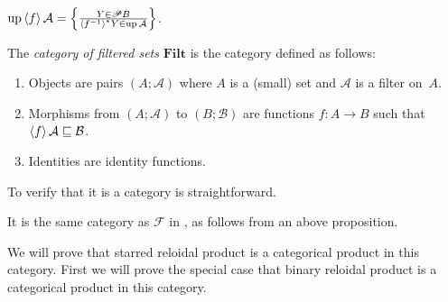 \begin{cor}
$\operatorname{up}\left\langle f\right\rangle\mathcal{A} = \left\{ \frac{Y\in\mathscr{P} B}{\left\langle f^{-1}\right\rangle ^{\ast}Y\in\operatorname{up}\mathcal{A}}\right\}$.
\end{cor}

\begin{defn}
The \emph{category of filtered sets} $\mathbf{Filt}$ is the category defined as follows:
\begin{enumerate}
\item Objects are pairs $(A;\mathcal{A})$ where $A$ is a (small) set and $\mathcal{A}$ is a filter on~$A$.
\item Morphisms from $(A;\mathcal{A})$ to $(B;\mathcal{B})$ are functions $f:A\rightarrow B$ such that
$\left\langle f\right\rangle\mathcal{A} \sqsubseteq \mathcal{B}$.
\item Identities are identity functions.
\end{enumerate}
\end{defn}

To verify that it is a category is straightforward.

It is the same category as $\mathscr{F}$ in \cite{filt-cat}, as follows from an above proposition.

We will prove that starred reloidal product is a categorical product in this category.
First we will prove the special case that binary reloidal product is a categorical product in this category.